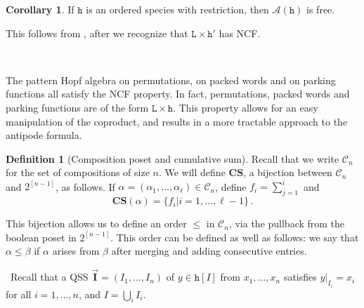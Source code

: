 \documentclass[12pt, reqno]{amsart}
\theoremstyle{definition}
\newtheorem{cor}[thm]{Corollary}
\newtheorem{defin}[thm]{Definition}
\newcommand{\III}{\vec{\mathbf{I}}}
\begin{document}
\begin{cor}
If $\mathtt{h}$ is an ordered species with restriction, then $\mathcal A(\mathtt{h})$ is free.
\end{cor}
This follows from \cite{Vargas}, after we recognize that $\mathtt{L} \times \mathtt{h}'$ has NCF.

\

The pattern Hopf algebra on permutations, on packed words and on parking functions all satisfy the NCF property.
In fact, permutations, packed words and parking functions are of the form $\mathtt{L} \times \mathtt{h}$.
This property allows for an easy manipulation of the coproduct, and results in a more tractable approach to the antipode formula.

\begin{defin}[Composition poset and cumulative sum]
Recall that we write $\mathcal C_n$ for the set of compositions of size $n$.
We will define $\mathbf{CS}$, a bijection between $\mathcal C_n $ and $2^{[n-1]}$, as follows.
If $\alpha =(\alpha_1, \dots, \alpha_{\ell} ) \in \mathcal C_n$, define $f_i = \sum_{j=1}^i$ and 
$$\mathbf{CS}(\alpha) = \{f_i | i = 1, \dots, \ell - 1\} \, .$$

This bijection allows us to define an order $\leq $ in $\mathcal C_n$, via the pullback from the boolean poset in $2^{[n-1]}$.
This order can be defined as well as follows: we say that $\alpha \leq \beta$ if $\alpha$ arises from $\beta $ after merging and adding consecutive entries.
\end{defin}

\
Recall that a QSS $\III = (I_1, \dots , I_n)$ of $y\in \mathtt{h}[I]$ from $x_1, \dots, x_n$ satisfies $y|_{I_i} = x_i$ for all $i = 1, \dots , n$, and $I = \bigcup_i I_i$.
\end{document}
